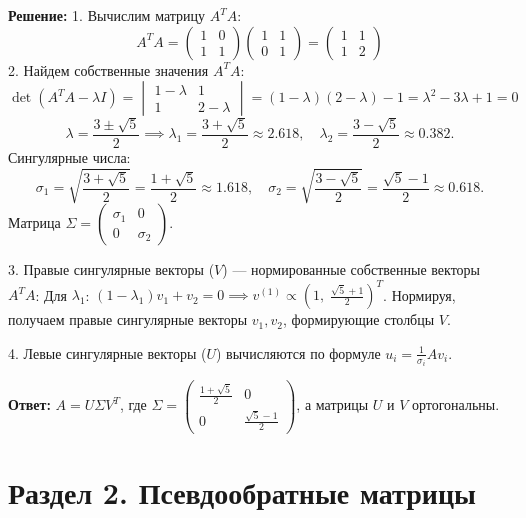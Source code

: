 \documentclass[11pt, a4paper]{article}
\begin{document}
\textbf{Решение:}
1. Вычислим матрицу $A^T A$:
$$ A^T A = \begin{pmatrix} 1 & 0 \\ 1 & 1 \end{pmatrix} \begin{pmatrix} 1 & 1 \\ 0 & 1 \end{pmatrix} = \begin{pmatrix} 1 & 1 \\ 1 & 2 \end{pmatrix} $$
2. Найдем собственные значения $A^T A$:
$$ \det(A^T A - \lambda I) = \begin{vmatrix} 1-\lambda & 1 \\ 1 & 2-\lambda \end{vmatrix} = (1-\lambda)(2-\lambda) - 1 = \lambda^2 - 3\lambda + 1 = 0 $$
$$ \lambda = \frac{3 \pm \sqrt{5}}{2} \implies \lambda_1 = \frac{3+\sqrt{5}}{2} \approx 2.618, \quad \lambda_2 = \frac{3-\sqrt{5}}{2} \approx 0.382. $$
Сингулярные числа:
$$ \sigma_1 = \sqrt{\frac{3+\sqrt{5}}{2}} = \frac{1+\sqrt{5}}{2} \approx 1.618, \quad \sigma_2 = \sqrt{\frac{3-\sqrt{5}}{2}} = \frac{\sqrt{5}-1}{2} \approx 0.618. $$
Матрица $\Sigma = \begin{pmatrix} \sigma_1 & 0 \\ 0 & \sigma_2 \end{pmatrix}$.

3. Правые сингулярные векторы ($V$) --- нормированные собственные векторы $A^T A$:
Для $\lambda_1$: $(1-\lambda_1) v_1 + v_2 = 0 \implies v^{(1)} \propto \left(1, \; \frac{\sqrt{5}+1}{2}\right)^T$.
Нормируя, получаем правые сингулярные векторы $v_1, v_2$, формирующие столбцы $V$.

4. Левые сингулярные векторы ($U$) вычисляются по формуле $u_i = \frac{1}{\sigma_i} A v_i$.

\textbf{Ответ:} $A = U \Sigma V^T$, где $\Sigma = \begin{pmatrix} \frac{1+\sqrt{5}}{2} & 0 \\ 0 & \frac{\sqrt{5}-1}{2} \end{pmatrix}$, а матрицы $U$ и $V$ ортогональны.

\newpage

\section{Раздел 2. Псевдообратные матрицы}
\end{document}
